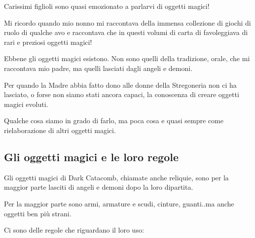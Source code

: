 \documentclass[12pt,a4paper,twoside,openany]{book}
\begin{document}
\begin{multicols}{2}

Carissimi figlioli sono quasi emozionato a parlarvi di oggetti magici!

Mi ricordo quando mio nonno mi raccontava della immensa collezione di giochi di ruolo di qualche avo e raccontava che in questi volumi di carta di favoleggiava di rari e preziosi oggetti magici!

Ebbene gli oggetti magici esistono.
Non sono quelli della tradizione, orale, che mi raccontava mio padre, ma quelli lasciati dagli angeli e demoni.

Per quando la Madre abbia fatto dono alle donne della Stregoneria non ci ha lasciato, o forse non siamo stati ancora capaci, la conoscenza di creare oggetti magici evoluti.

Qualche cosa siamo in grado di farlo, ma poca cosa e quasi sempre come rielaborazione di altri oggetti magici.

\subsection{Gli oggetti magici e le loro regole}

Gli oggetti magici di Dark Catacomb, chiamate anche reliquie, sono per la maggior parte lasciti di angeli e demoni dopo la loro dipartita.

Per la maggior parte sono armi, armature e scudi, cinture, guanti..ma anche oggetti ben più strani.

Ci sono delle regole che riguardano il loro uso:


\end{multicols}
\end{document}
